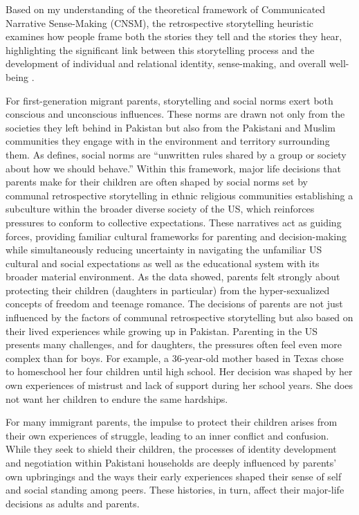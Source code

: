 Based on my understanding of the theoretical framework of Communicated Narrative Sense-Making (CNSM), the retrospective storytelling heuristic examines how people frame both the stories they tell and the stories they hear, highlighting the significant link between this storytelling process and the development of individual and relational identity, sense-making, and overall well-being \citep[p.~120]{koenigkellasCommunicatedNarrativeSenseMaking2022}. 

For first-generation migrant parents, storytelling and social norms exert both conscious and unconscious influences. These norms are drawn not only from the societies they left behind in Pakistan but also from the Pakistani and Muslim communities they engage with in the environment and territory surrounding them. As \citet[Ch.~5]{perloffDynamicsPersuasionCommunication2023} defines, social norms are ``unwritten rules shared by a group or society about how we should behave.'' Within this framework, major life decisions that parents make for their children are often shaped by social norms set by communal retrospective storytelling in ethnic religious communities establishing a subculture within the broader diverse society of the US, which reinforces pressures to conform to collective expectations. These narratives act as guiding forces, providing familiar cultural frameworks for parenting and decision-making while simultaneously reducing uncertainty in navigating the unfamiliar US cultural and social expectations as well as the educational system with its broader material environment. As the data showed, parents felt strongly about protecting their children (daughters in particular) from the hyper-sexualized concepts of freedom and teenage romance. The decisions of parents are not just influenced by the factors of communal retrospective storytelling but also based on their lived experiences while growing up in Pakistan. Parenting in the US presents many challenges, and for daughters, the pressures often feel even more complex than for boys. For example, a 36-year-old mother based in Texas chose to homeschool her four children until high school. Her decision was shaped by her own experiences of mistrust and lack of support during her school years. She does not want her children to endure the same hardships.

For many immigrant parents, the impulse to protect their children arises from their own experiences of struggle, leading to an inner conflict and confusion. While they seek to shield their children, the processes of identity development and negotiation within Pakistani households are deeply influenced by parents’ own upbringings and the ways their early experiences shaped their sense of self and social standing among peers. These histories, in turn, affect their major-life decisions as adults and parents.

